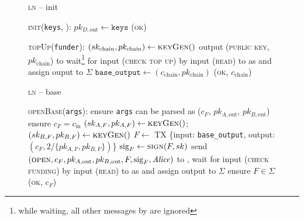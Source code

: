 \begin{figure}[H]
  \begin{processbox}{\textsc{ln} -- init}
    \begin{algorithmic}[1]
      \State \textsc{init}(\texttt{keys}, \dave):
      \Indent
        \State $pk_{D, \mathrm{out}} \gets \texttt{keys}$
        \State \Return (\textsc{ok})
      \EndIndent
      \Statex

      \State \textsc{topUp}(\texttt{funder}): 
      \Indent
        \State $(sk_{\mathrm{chain}}, pk_{\mathrm{chain}}) \gets
        \textsc{keyGen}()$
        \State output (\textsc{public key}, $pk_{\mathrm{chain}}$) to \dave
          \State wait\footnote{while waiting, all other messages by \dave are
          ignored} for input (\textsc{check top up}) by \dave
          \State input (\textsc{read}) to \ledger as \dave and assign ouput to
          $\Sigma$
        \EndWhile
        \State $\texttt{base\_output} \gets (c_{\mathrm{chain}},
        pk_{\mathrm{chain}})$
        \State \Return (\textsc{ok}, $c_{\mathrm{chain}}$)
      \EndIndent
    \end{algorithmic}
  \end{processbox}
  \caption{}
  \label{code:ln:init}
\end{figure}

\begin{figure}[H]
  \begin{processbox}{\textsc{ln} -- base}
    \begin{algorithmic}[1]
      \State \textsc{openBase}(\texttt{args}):
      \Indent
        \State ensure \texttt{args} can be parsed as ($c_F$, $pk_{A,
        \mathrm{out}}$, $pk_{B, \mathrm{out}}$)
        \State ensure $c_F = c_{\mathrm{in}}$
        \State $(sk_{A, F}, pk_{A, F}) \gets \textsc{keyGen}()$; $(sk_{B, F},
        pk_{B, F}) \gets \textsc{keyGen}()$
        \State $F \gets$ TX \{input: \texttt{base\_output}, output: $(c_F,
        2/\{pk_{A, F}, pk_{B, F}\})$\}
        \State $\mathrm{sig}_F \gets \textsc{sign}(F, sk)$
        \State send $(\textsc{open}, c_F, pk_{A, \mathrm{out}}, pk_{B,
        \mathrm{out}}, F, \mathrm{sig}_F, \mathit{Alice})$ to \adversary, wait for
        input (\textsc{check funding}) by \alice
        \State input (\textsc{read}) to \ledger as \alice and assign output to
        $\Sigma$
        \State ensure $F \in \Sigma$
        \State \Return (\textsc{ok}, $c_F$)
      \EndIndent
    \end{algorithmic}
  \end{processbox}
  \caption{}
  \label{code:ln:base}
\end{figure}

